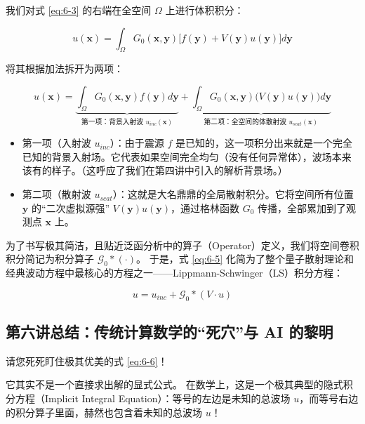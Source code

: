 \documentclass[12pt]{article}
\begin{document}
{我们对式 \eqref{eq:6-3} 的右端在全空间 $\Omega$ 上进行体积积分：

\begin{equation}
u(\mathbf{x}) = \int_{\Omega} G_0(\mathbf{x}, \mathbf{y}) \Big[ f(\mathbf{y}) + V(\mathbf{y}) u(\mathbf{y}) \Big] d\mathbf{y}
\label{eq:6-int-full}
\end{equation}

将其根据加法拆开为两项：

\begin{equation}
u(\mathbf{x})
=
\underbrace{\int_{\Omega} G_0(\mathbf{x}, \mathbf{y}) f(\mathbf{y}) d\mathbf{y}}_{\text{第一项：背景入射波 } u_{inc}(\mathbf{x})}
+
\underbrace{\int_{\Omega} G_0(\mathbf{x}, \mathbf{y}) \big( V(\mathbf{y}) u(\mathbf{y}) \big) d\mathbf{y}}_{\text{第二项：全空间的体散射波 } u_{scat}(\mathbf{x})}
\label{eq:6-5}
\end{equation}

\begin{itemize}[leftmargin=2em]
    \item 第一项（入射波 $u_{inc}$）：由于震源 $f$ 是已知的，这一项积分出来就是一个完全已知的背景入射场。它代表如果空间完全均匀（没有任何异常体），波场本来该有的样子。（这呼应了我们在第四讲中引入的解析背景场。）
    \item 第二项（散射波 $u_{scat}$）：这就是大名鼎鼎的全局散射积分。它将空间所有位置 $\mathbf{y}$ 的“二次虚拟源强” $V(\mathbf{y}) u(\mathbf{y})$，通过格林函数 $G_0$ 传播，全部累加到了观测点 $\mathbf{x}$ 上。
\end{itemize}

为了书写极其简洁，且贴近泛函分析中的算子（Operator）定义，我们将空间卷积积分简记为积分算子 $\mathcal{G}_0 * (\cdot)$。
于是，式 \eqref{eq:6-5} 化简为了整个量子散射理论和经典波动方程中最核心的方程之一——Lippmann-Schwinger（LS）积分方程：

\begin{equation}
u = u_{inc} + \mathcal{G}_0 * (V \cdot u)
\label{eq:6-6}
\end{equation}

\subsection{第六讲总结：传统计算数学的“死穴”与 AI 的黎明}

请您死死盯住极其优美的式 \eqref{eq:6-6}！

它其实不是一个直接求出解的显式公式。
在数学上，这是一个极其典型的隐式积分方程（Implicit Integral Equation）：等号的左边是未知的总波场 $u$，而等号右边的积分算子里面，赫然也包含着未知的总波场 $u$！

}
\end{document}
